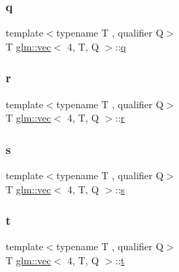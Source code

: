 \subsubsection{\texorpdfstring{q}{q}}
{\footnotesize\ttfamily template$<$typename T , qualifier Q$>$ \\
T \mbox{\hyperlink{structglm_1_1vec}{glm\+::vec}}$<$ 4, T, Q $>$\+::\mbox{\hyperlink{_s_d_l__opengl_8h_a8fc1e7b9baaae687804c7eed46ca09c6}{q}}}

\mbox{\label{structglm_1_1vec_3_014_00_01_t_00_01_q_01_4_a2b985b974ca60ce93681865d0251adbd}} 
\subsubsection{\texorpdfstring{r}{r}}
{\footnotesize\ttfamily template$<$typename T , qualifier Q$>$ \\
T \mbox{\hyperlink{structglm_1_1vec}{glm\+::vec}}$<$ 4, T, Q $>$\+::\mbox{\hyperlink{_s_d_l__opengl_8h_a42ce7cdc612e53abee15043f80220d97}{r}}}

\mbox{\label{structglm_1_1vec_3_014_00_01_t_00_01_q_01_4_af72c3f5a2b95f3b81b0b3a751b260fe7}} 
\subsubsection{\texorpdfstring{s}{s}}
{\footnotesize\ttfamily template$<$typename T , qualifier Q$>$ \\
T \mbox{\hyperlink{structglm_1_1vec}{glm\+::vec}}$<$ 4, T, Q $>$\+::\mbox{\hyperlink{_s_d_l__opengl_8h_a4af680a6c683f88ed67b76f207f2e6e4}{s}}}

\mbox{\label{structglm_1_1vec_3_014_00_01_t_00_01_q_01_4_ab022af720f5053ff65c7ea8688289ce1}} 
\subsubsection{\texorpdfstring{t}{t}}
{\footnotesize\ttfamily template$<$typename T , qualifier Q$>$ \\
T \mbox{\hyperlink{structglm_1_1vec}{glm\+::vec}}$<$ 4, T, Q $>$\+::\mbox{\hyperlink{_s_d_l__opengl_8h_a7d65d00ca3b0630d9b5c52df855b19f5}{t}}}

